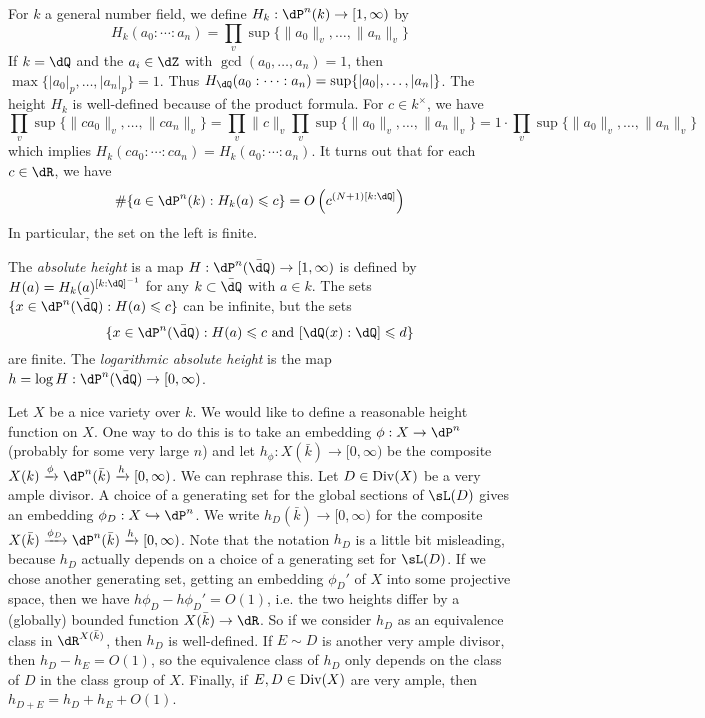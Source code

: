 \documentclass{article}
\begin{document}
For $k$ a general number field, we define $H_k:\dP^n(k)\to [1,\infty)$ by 
\[
  H_k(a_0:\cdots:a_n) = \prod_v \sup\{ \|a_0\|_v,\dots,\|a_n\|_v\}
\]
If $k=\dQ$ and the $a_i\in \dZ$ with $\gcd(a_0,\dots,a_n)=1$, then 
$\max\{|a_0|_p,\dots,|a_n|_p\}=1$. Thus 
$H_\dQ(a_0:\cdots:a_n)=\sup\{|a_0|,\dots,|a_n|\}$. The height $H_k$ is 
well-defined because of the product formula. For $c\in k^\times$, we have 
\[
  \prod_v \sup\{\|ca_0\|_v,\dots,\|ca_n\|_v\} = \prod_v \|c\|_v \prod_v \sup\{\|a_0\|_v,\dots,\|a_n\|_v\} = 1\cdot \prod_v \sup\{\|a_0\|_v,\dots,\|a_n\|_v\}
\]
which implies $H_k(c a_0:\cdots:c a_n)=H_k(a_0:\cdots:a_n)$. It turns out that 
for each $c\in \dR$, we have  
\[
  \#\{a\in \dP^n(k) : H_k(a)\leqslant c\} = O\left(c^{(N+1)[k:\dQ]}\right)
\]
In particular, the set on the left is finite. 

The \emph{absolute height} is a map $H:\dP^n(\bar\dQ)\to [1,\infty)$ is defined 
by $H(a) = H_k(a)^{[k:\dQ]^{-1}}$ for any $k\subset \bar\dQ$ with $a\in k$. 
The sets $\{x\in \dP^n(\bar\dQ):H(a)\leqslant c\}$ can be infinite, but the 
sets 
\[
  \{x\in \dP^n(\bar\dQ):H(a)\leqslant c\text{ and } [\dQ(x):\dQ]\leqslant d\}
\]
are finite. The \emph{logarithmic absolute height} is the map 
$h=\log H:\dP^n(\bar\dQ)\to [0,\infty)$. 

Let $X$ be a nice variety over $k$. We would like to define a reasonable height 
function on $X$. One way to do this is to take an embedding $\phi:X\to \dP^n$ 
(probably for some very large $n$) and let $h_\phi:X(\bar k)\to [0,\infty)$ be 
the composite $X(k) \xrightarrow\phi \dP^n(\bar k) \xrightarrow{h} [0,\infty)$. 
We can rephrase this. Let $D\in \operatorname{Div}(X)$ be a very ample divisor. A choice of a 
generating set for the global sections of $\sL(D)$ gives an embedding 
$\phi_D:X\hookrightarrow \dP^n$. We write $h_D(\bar k)\to [0,\infty)$ for the 
composite 
$X(\bar k) \xrightarrow{\phi_D} \dP^n(\bar k)\xrightarrow{h} [0,\infty)$. Note 
that the notation $h_D$ is a little bit misleading, because $h_D$ actually 
depends on a choice of a generating set for $\sL(D)$. If we chose another 
generating set, getting an embedding $\phi_D'$ of $X$ into some projective 
space, then we have $h \phi_D - h \phi_D'=O(1)$, i.e. the two heights differ by 
a (globally) bounded function $X(\bar k)\to \dR$. So if we consider 
$h_D$ as an equivalence class in $\dR^{X(\bar k)}$, then $h_D$ is well-defined. 
If $E\sim D$ is another very ample divisor, then $h_D-h_E=O(1)$, so the 
equivalence class of $h_D$ only depends on the class of $D$ in the class group 
of $X$. Finally, if $E,D\in \operatorname{Div}(X)$ are very ample, then 
$h_{D+E}=h_D+h_E+O(1)$. 
\end{document}
